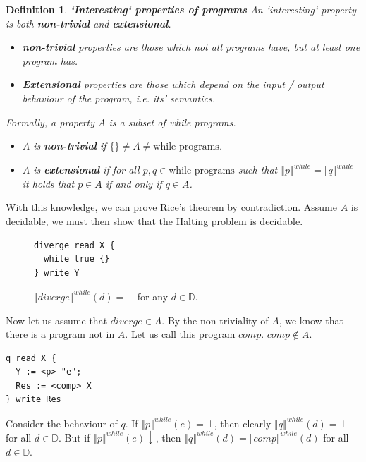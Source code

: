 \documentclass[a4paper, final]{article}
\newtheorem{definition}{Definition}
\begin{document}
\begin{definition}
	\textbf{`Interesting` properties of programs}
	An `interesting` property is both \textbf{non-trivial} and \textbf{extensional}.

	\begin{itemize}
		\item \textbf{non-trivial} properties are those which not all programs have, but at least one program has.
		\item \textbf{Extensional} properties are those which depend on the input / output behaviour of the program,
		      i.e. its' semantics.
	\end{itemize}

	Formally, a property $A$ is a subset of while programs.

	\begin{itemize}
		\item $A$ is \textbf{non-trivial} if $\{\}\neq A\neq \textrm{while-programs}$.
		\item $A$ is \textbf{extensional} if for all $p,q\in\textrm{while-programs}$ such that
		      $\llbracket p\rrbracket^{while}=\llbracket q \rrbracket^{while}$ it holds that $p\in A$ if and only if $q\in A$.
	\end{itemize}

\end{definition}

With this knowledge, we can prove Rice's theorem by contradiction. Assume $A$ is decidable, we must then show that
the Halting problem is decidable.

\begin{figure}[H]
	\begin{lstlisting}
diverge read X {
  while true {}
} write Y
\end{lstlisting}
	$\llbracket diverge \rrbracket^{while}(d)=\bot$ for any $d\in\mathbb{D}$.
\end{figure}

Now let us assume that $diverge\in A$. By the non-triviality of $A$, we know that there is a program not in $A$.
Let us call this program $comp$. $comp\notin A$.

\begin{lstlisting}
q read X {
  Y := <p> "e";
  Res := <comp> X
} write Res
\end{lstlisting}

Consider the behaviour of $q$. If $\llbracket p \rrbracket^{while}(e)=\bot$, then clearly
$\llbracket q \rrbracket^{while}(d)=\bot$ for all $d\in\mathbb{D}$. But if $\llbracket p \rrbracket^{while}(e)\downarrow$,
then $\llbracket q \rrbracket^{while}(d)=\llbracket comp \rrbracket^{while}(d)$ for all $d\in\mathbb{D}$.
\end{document}
